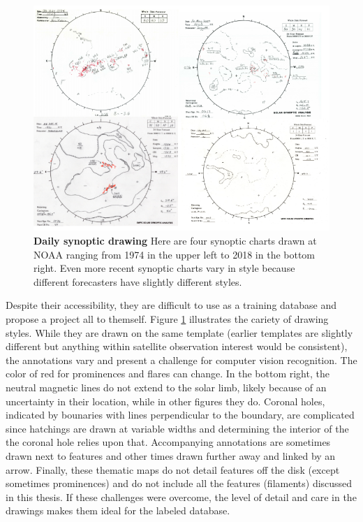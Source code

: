 \documentclass[twoside]{report}
\begin{document}
\begin{figure}[ht]
  \begin{center}
    \includegraphics[scale=0.8]{synoptic}
    \caption{{\bf Daily synoptic drawing} Here are four synoptic charts drawn at NOAA ranging from 1974 in the upper left to 2018 in the bottom right. Even more recent synoptic charts vary in style because different forecasters have slightly different styles.}
    \label{fig:synoptic}
 \end{center}
\end{figure}

Despite their accessibility, they are difficult to use as a training database and propose a project all to themself. Figure \ref{fig:synoptic} illustrates the cariety of drawing styles. While they are drawn on the same template (earlier templates are slightly different but anything within satellite observation interest would be consistent), the annotations vary and present a challenge for computer vision recognition. The color of red for prominences and flares can change. In the bottom right, the neutral magnetic lines do not extend to the solar limb, likely because of an uncertainty in their location, while in other figures they do. Coronal holes, indicated by bounaries with lines perpendicular to the boundary, are complicated since hatchings are drawn at variable widths and determining the interior of the the coronal hole relies upon that. Accompanying annotations are sometimes drawn next to features and other times drawn further away and linked by an arrow. Finally, these thematic maps do not detail features off the disk (except sometimes prominences) and do not include all the features (filaments) discussed in this thesis. If these challenges were overcome, the level of detail and care in the drawings makes them ideal for the labeled database. 
\end{document}
